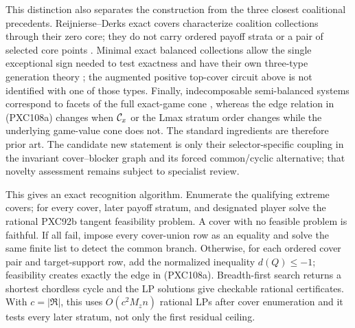 \documentclass[11pt]{article}
\begin{document}
This distinction also separates the construction from the three closest
coalitional precedents.  Reijnierse--Derks exact covers characterize
coalition collections through their zero core; they do not carry ordered
payoff strata or a pair of selected core points
\citep{ReijnierseDerks1998}.  Minimal exact balanced collections allow the
single exceptional sign needed to test exactness and have their own
three-type generation theory \citep{LohmannBormHerings2012}; the augmented
positive top-cover circuit above is not identified with one of those types.
Finally, indecomposable semi-balanced systems correspond to facets of the
full exact-game cone \citep{StudenyKratochvil2022}, whereas the edge relation
in (PXC108a) changes when \({\cal C}_x\) or the Lmax stratum order changes
while the underlying game-value cone does not.  The standard ingredients are
therefore prior art.  The candidate new statement is only their
selector-specific coupling in the invariant cover--blocker graph and its
forced common/cyclic alternative; that novelty assessment remains subject to
specialist review.

This gives an exact recognition algorithm.  Enumerate the qualifying extreme
covers; for every cover, later payoff stratum, and designated player solve
the rational PXC92b tangent feasibility problem.  A cover with no feasible
problem is faithful.  If all fail, impose every cover-union row as an
equality and solve the same finite list to detect the common branch.
Otherwise, for each ordered cover pair and target-support row, add the
normalized inequality \(d(Q)\le-1\); feasibility creates exactly the edge
in (PXC108a).  Breadth-first search returns a shortest chordless cycle and
the LP solutions give checkable rational certificates.  With
\(c=|\mathfrak R|\), this uses \(O(c^2M_zn)\) rational LPs after cover
enumeration and it tests every later stratum, not only the first residual
ceiling.
\end{document}
